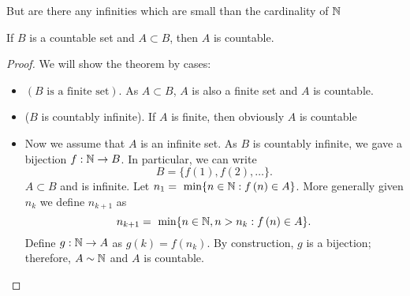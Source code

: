 But are there any infinities which are small than the cardinality of $\mathbb{N}$
\begin{theorem}
	If $B$ is a countable set and $A \subset B$, then $A$ is countable.	
\end{theorem}

\begin{proof}
	We will show the theorem by cases:
	\begin{itemize}
		\item $\left( B \text{ is a finite set}\right) $. As $A \subset B$, $A$ is also a finite set and $A $ is countable.
		\item ($B$ is countably infinite). If $A$ is finite, then obviously  $A$ is countable
		\item Now we assume that $A$ is an infinite set. As $B$ is countably infinite, we gave a bijection $f: \mathbb{N} \to B$. In particular, we can write
			\[
				B = \{f\left( 1 \right), f\left( 2 \right), \ldots\}
			.\]
			$A \subset B$ and is infinite. Let $n_1 = \text{ min} \{n \in \mathbb{N} : f\left( n \right) \in A\}$. More generally given $n_k$ we define $n_{k+1}$ as 
			 \[
				 n_{k+1} = \text{ min} \{n \in \mathbb{N}, n > n_k : f\left( n \right) \in A\}
			.\] 
			Define $g: \mathbb{N} \to A$ as $g\left( k \right) = f\left( n_k \right) $. By construction, $g$ is a bijection; therefore, $A \sim \mathbb{N}$ and $A$ is countable.
	\end{itemize}
\end{proof}





